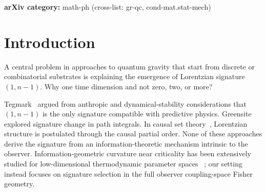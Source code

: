 \documentclass[11pt]{article}
\theoremstyle{definition}
\theoremstyle{remark}
\begin{document}
\begin{abstract}
and $507/507$ graphs with $\kappa \leq 1$ (100\%) selecting $q = 1$, versus only
$19\%$ for random positive definite matrices.
\textbf{Discrete symmetries:} The construction possesses exact charge
conjugation~($C$) and parity~($P$) symmetries but violates time
reversal~($T \colon S \mapsto -S$): $W(1) > W(m{-}1)$, with maximal
violation on trees ($W(m{-}1) = 0$). This $T$-violation is the
information-geometric origin of the time/space asymmetry.
\textbf{Observer kinematics:} The Raychaudhuri-type vorticity
$\omega_{ab}$ of the timelike eigenvector vanishes on trees and is
nonzero on all $263$~cyclic graphs ($n \leq 7$ atlas, $100\%$
accuracy, $10^{9}$ gap ratio), providing a ``magnetic-like''
geometric observable intrinsic to the Fisher information geometry.
The raw Raychaudhuri identity is verified on all $285$~processable
graphs (mean residual $10^{-5}$).

\medskip
\noindent\textbf{Keywords}: Lorentzian signature, Fisher information,
spectral gap, Ising model, information geometry, spacetime emergence, O(N) models,
CPT symmetry, vorticity
\end{abstract}

\noindent\textbf{arXiv category:} math-ph (cross-list: gr-qc, cond-mat.stat-mech)

\section{Introduction}
\label{sec:intro}

A central problem in approaches to quantum gravity that start from discrete
or combinatorial substrates is explaining the emergence of Lorentzian
signature~$(1,n{-}1)$. Why one time dimension and not zero, two, or more?

Tegmark~\cite{Tegmark1997} argued from anthropic and dynamical-stability
considerations that $(1,n{-}1)$ is the only signature compatible with
predictive physics. Greensite~\cite{Greensite1993} explored signature change
in path integrals. In causal set theory~\cite{Sorkin1991,Bombelli1987},
Lorentzian structure is postulated through the causal partial order. None of
these approaches derive the signature from an information-theoretic
mechanism intrinsic to the observer.
Information-geometric curvature near criticality has been extensively studied
for low-dimensional thermodynamic parameter spaces
~\cite{Ruppeiner1979,Ruppeiner1995,Janke2004,BrodyRitz2003}; our setting instead focuses on
signature selection in the full observer coupling-space Fisher geometry.
\end{document}
